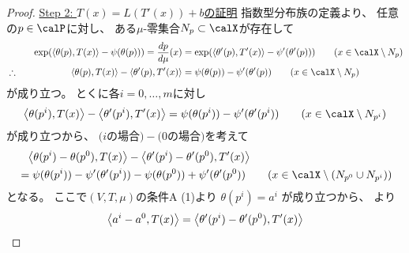 \documentclass[report]{jlreq}
\begin{document}
\begin{proof}
    \uline{Step 2: $T(x) = L(T'(x)) + b$の証明} \quad
    指数型分布族の定義より、
    任意の$p \in \calP$に対し、
    ある$\mu$-零集合$N_p \subset \calX$が存在して
    \begin{alignat}{2}
        &\phantom{\therefore}& \quad
            \exp(\myangle{\theta(p)}{T(x)} - \psi(\theta(p)))
                =
                    \dd[p]{\mu}(x)
                &=
                    \exp(\myangle{\theta'(p)}{T'(x)} - \psi'(\theta'(p)))
                \qquad
                    (x \in \calX \setminus N_p)
            \\
        &\therefore& \quad
            \myangle{\theta(p)}{T(x)}
                - \myangle{\theta'(p)}{T'(x)}
                &=
                    \psi(\theta(p))
                    - \psi'(\theta'(p))
                \qquad
                    (x \in \calX \setminus N_p)
            \label{eq:pairings-and-log-partition}
    \end{alignat}
    が成り立つ。
    とくに各$i = 0, \dots, m$に対し
    \begin{equation}
        \myangle{\theta(p^i)}{T(x)}
            - \myangle{\theta'(p^i)}{T'(x)}
            =
                \psi(\theta(p^i))
                - \psi'(\theta'(p^i))
            \qquad
                (x \in \calX \setminus N_{p^i})
    \end{equation}
    が成り立つから、
    $\text{($i$の場合)} - \text{($0$の場合)}$を考えて
    \begin{equation}
        \begin{alignedat}{1}
            &\phantom{=}
                \myangle{\theta(p^i) - \theta(p^0)}{T(x)}
                - \myangle{\theta'(p^i) - \theta'(p^0)}{T'(x)}
                \\
            &=
                \psi(\theta(p^i))
                - \psi'(\theta'(p^i))
                - \psi(\theta(p^0))
                + \psi'(\theta'(p^0))
                \qquad
                (x \in \calX \setminus (N_{p^0} \cup N_{p^i}))
        \end{alignedat}
        \locallabel{eq:1}
    \end{equation}
    となる。
    ここで$(V, T, \mu)$の条件A (1)より
    $\theta(p^i) = a^i$
    が成り立つから、
    より
    \begin{equation}
        \begin{alignedat}{1}
            \myangle{a^i - a^0}{T(x)}
                &=
                    \myangle{\theta'(p^i) - \theta'(p^0)}{T'(x)}
                    \\

\end{alignedat}
\end{equation}
\end{proof}
\end{document}
